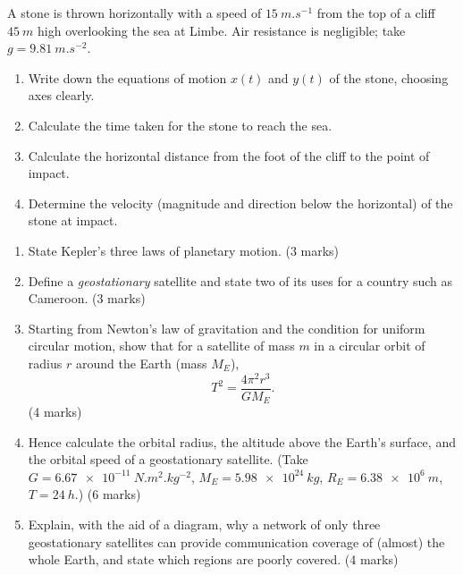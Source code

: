 \documentclass[11pt]{article}
\newcounter{popsec}
\newcounter{popsub}
\newcommand{\courssub}[1]{%
  \stepcounter{popsub}%
  \par\vspace{9pt}\noindent{\popxbold\fontsize{11.5}{13}\selectfont\color{popink}{\color{poporange}\thepopsec.\thepopsub}\hspace{6pt}#1}\par\nopagebreak\vspace{4pt}
}
\begin{document}
\begin{exercice}
A stone is thrown horizontally with a speed of $\SI{15}{m.s^{-1}}$ from the top of a cliff $\SI{45}{m}$ high overlooking the sea at Limbe. Air resistance is negligible; take $g = \SI{9.81}{m.s^{-2}}$.
\begin{enumerate}
\item Write down the equations of motion $x(t)$ and $y(t)$ of the stone, choosing axes clearly.
\item Calculate the time taken for the stone to reach the sea.
\item Calculate the horizontal distance from the foot of the cliff to the point of impact.
\item Determine the velocity (magnitude and direction below the horizontal) of the stone at impact.
\end{enumerate}
\end{exercice}

\courssub{I prepare for the GCE}

\begin{exercice}
\begin{enumerate}
\item State Kepler's three laws of planetary motion. \hfill (3 marks)
\item Define a \emph{geostationary} satellite and state two of its uses for a country such as Cameroon. \hfill (3 marks)
\item Starting from Newton's law of gravitation and the condition for uniform circular motion, show that for a satellite of mass $m$ in a circular orbit of radius $r$ around the Earth (mass $M_E$),
\[ T^2 = \frac{4\pi^2 r^3}{G M_E}. \] \hfill (4 marks)
\item Hence calculate the orbital radius, the altitude above the Earth's surface, and the orbital speed of a geostationary satellite. (Take $G = \SI{6.67e-11}{N.m^2.kg^{-2}}$, $M_E = \SI{5.98e24}{kg}$, $R_E = \SI{6.38e6}{m}$, $T = \SI{24}{h}$.) \hfill (6 marks)
\item Explain, with the aid of a diagram, why a network of only three geostationary satellites can provide communication coverage of (almost) the whole Earth, and state which regions are poorly covered. \hfill (4 marks)
\end{enumerate}
\end{exercice}
\end{document}
